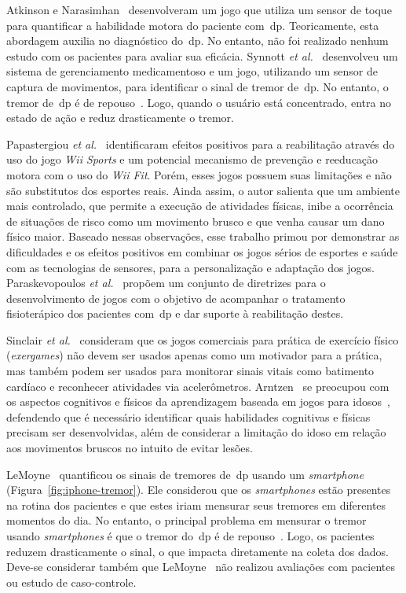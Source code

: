 Atkinson e Narasimhan~\cite{atkinson2010} desenvolveram um jogo que utiliza um sensor de toque para quantificar a habilidade motora do paciente com~\ac{dp}. Teoricamente, esta abordagem auxilia no diagnóstico do~\ac{dp}. No entanto, não foi realizado nenhum estudo com os pacientes para avaliar sua eficácia. Synnott \textit{et al.}~\cite{synnott_wiipd_2012} desenvolveu um sistema de gerenciamento medicamentoso e um jogo, utilizando um sensor de captura de movimentos, para identificar o sinal de tremor de~\ac{dp}. No entanto, o tremor de~\ac{dp} é de repouso~\cite{national2006parkinson}. Logo, quando o usuário está concentrado, entra no estado de ação e reduz drasticamente o tremor.

Papastergiou \textit{et al.}~\cite{Papastergiou:2009:EPC:1570538.1570707} identificaram efeitos positivos para a reabilitação através do uso do jogo \textit{Wii Sports} e um potencial mecanismo de prevenção e reeducação motora com o uso do \textit{Wii Fit}. Porém, esses jogos possuem suas limitações e não são substitutos dos esportes reais. Ainda assim, o autor salienta que um ambiente mais controlado, que permite a execução de atividades físicas, inibe a ocorrência de situações de risco como um movimento brusco e que venha causar um dano físico maior. Baseado nessas observações, esse trabalho primou por demonstrar as dificuldades e os efeitos positivos em combinar os jogos sérios de esportes e saúde com as tecnologias de sensores, para a personalização e adaptação dos jogos. Paraskevopoulos \textit{et al.}~\cite{sacbespoke2014} propõem um conjunto de diretrizes para o desenvolvimento de jogos com o objetivo de acompanhar o tratamento fisioterápico dos pacientes com~\ac{dp} e dar suporte à reabilitação destes.

Sinclair \textit{et al.}~\cite{Sinclair:2009:UVB:1515604.1515617} consideram que os jogos comerciais para prática de exercício físico (\textit{exergames}) não devem ser usados apenas como um motivador para a prática, mas também podem ser usados para monitorar sinais vitais como batimento cardíaco e reconhecer atividades via acelerômetros. Arntzen~\cite{arntzen2011} se preocupou com os aspectos cognitivos e físicos da aprendizagem baseada em jogos para idosos~\cite{arntzen2011}, defendendo que é necessário identificar quais habilidades cognitivas e físicas precisam ser desenvolvidas, além de considerar a limitação do idoso em relação aos movimentos bruscos no intuito de evitar lesões.

LeMoyne~\cite{lemoyne2010} quantificou os sinais de tremores de~\ac{dp} usando um \textit{smartphone} (Figura~\ref{fig:iphone-tremor}). Ele considerou que os \textit{smartphones} estão presentes na rotina dos pacientes e que estes iriam mensurar seus tremores em diferentes momentos do dia. No entanto, o principal problema em mensurar o tremor usando \textit{smartphones} é que o tremor do~\ac{dp} é de repouso~\cite{jankovic2008}. Logo, os pacientes reduzem drasticamente o sinal, o que impacta diretamente na coleta dos dados. Deve-se considerar também que LeMoyne~\cite{lemoyne2010} não realizou avaliações com pacientes ou estudo de caso-controle. 

